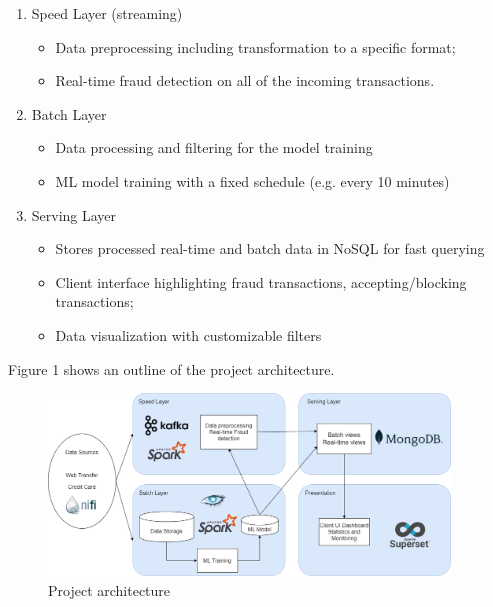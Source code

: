 \documentclass[12pt,a4paper, hidelinks]{article}
\begin{document}
\begin{enumerate}
    \item Speed Layer (streaming)
        \begin{itemize}
            \item Data preprocessing including transformation to a specific format;
            \item Real-time fraud detection on all of the incoming transactions.
        \end{itemize}
    \item Batch Layer
        \begin{itemize}
            \item Data processing and filtering for the model training
            \item ML model training with a fixed schedule (e.g. every 10 minutes)
        \end{itemize}
    \item Serving Layer
        \begin{itemize}
            \item Stores processed real-time and batch data in NoSQL for fast querying
            \item Client interface highlighting fraud transactions, accepting/blocking transactions;
            \item Data visualization with customizable filters
        \end{itemize}
\end{enumerate}

Figure 1 shows an outline of the project architecture.

\begin{figure}[htbp]
    \centering
    \includegraphics[width=0.95\textwidth]{images/m2-architecture.drawio.png}
    \caption{Project architecture}
    \label{fig:architecture}
\end{figure}
\end{document}
